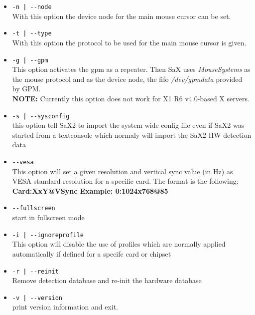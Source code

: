 \begin{itemize}
\item \verb+-n | --node+\\  
      With this option the device node for the main mouse cursor can be set.

\item \verb+-t | --type+\\
      With this  option the protocol to be used for the main mouse cursor
      is given. 

\item \verb+-g | --gpm+\\
      This option activates the gpm as a repeater. Then SaX uses 
      \textit{MouseSystems} as the mouse protocol and as the device node, the
      fifo \textit{/dev/gpmdata} provided by GPM.\\
      \textbf{NOTE:} Currently this option does not work for X1 R6 v4.0-based
      X servers.

\item \verb+-s | --sysconfig+\\
      this option tell SaX2 to import the system wide config file even
      if SaX2 was started from a textconsole which normaly will import
      the SaX2 HW detection data

\item \verb+--vesa+\\
      This  option will set a given resolution and vertical sync value
      (in Hz) as VESA standard resolution for  a  specific  card.  The
      format is the following: \textbf{Card:XxY@VSync Example: 0:1024x768@85}

\item \verb+--fullscreen+\\
      start in fullscreen mode

\item \verb+-i | --ignoreprofile+\\
      This option will disable the use of profiles which are normally
      applied automatically if defined for a specifc card or chipset

\item \verb+-r | --reinit+\\
      Remove detection database and re-init the hardware database

\item \verb+-v | --version+\\
      print version information and exit.
\end{itemize}

\newpage
 
